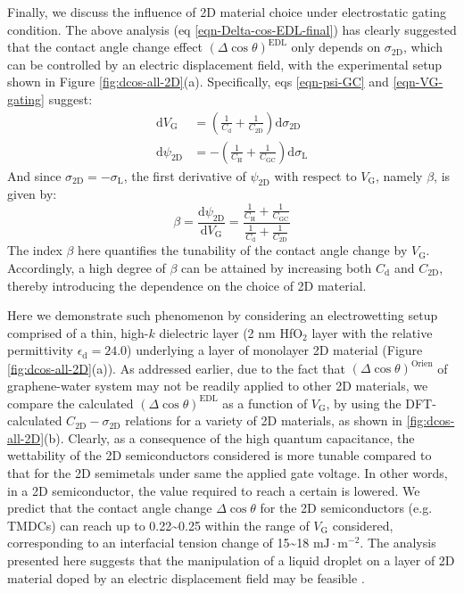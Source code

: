 \documentclass[journal=langd5,manuscript=article,email=true,hyperref=true,keywords=true]{achemso}
\begin{document}
Finally, we discuss the influence of 2D material choice under
electrostatic gating condition. The above analysis (eq
\ref{eqn-Delta-cos-EDL-final}) has clearly suggested that the contact
angle change effect \((\Delta \cos \theta)^{\mathrm{EDL}}\) only depends
on \(\sigma_{\mathrm{2D}}\), which can be controlled by an electric
displacement field, with the experimental setup shown in Figure
\ref{fig:dcos-all-2D}(a). Specifically,  eqs \ref{eqn-psi-GC} and
\ref{eqn-VG-gating} suggest:
\begin{equation}
\label{eqn-dVG-choice-2D}
\begin{aligned}
\mathrm{d} V_{\mathrm{G}} &= (\frac{1}{C_{\mathrm{d}}} + \frac{1}{C_{\mathrm{2D}}}) \mathrm{d} \sigma_{\mathrm{2D}} \\
\mathrm{d} \psi_{\mathrm{2D}} &= -(\frac{1}{C_{\mathrm{H}}} + \frac{1}{C_{\mathrm{GC}}}) \mathrm{d} \sigma_{\mathrm{L}}
\end{aligned}
\end{equation}
And since \(\sigma_{\mathrm{2D}} = -\sigma_{\mathrm{L}}\), the first
derivative of \(\psi_{\mathrm{2D}}\) with respect to \(V_{\mathrm{G}}\), namely \(\beta\), is given by:
\begin{equation}
\label{eqn-def-beta}
\beta = \frac{\mathrm{d} \psi_{\mathrm{2D}}}{\mathrm{d} V_{\mathrm{G}}} 
      = \frac{\frac{1}{C_{\mathrm{H}}} + \frac{1}{C_{\mathrm{GC}}}}{\frac{1}{C_{\mathrm{d}}} + \frac{1}{C_{\mathrm{2D}}}}
\end{equation}
The index \(\beta\) here quantifies the tunability of the contact angle change
by \(V_{\mathrm{G}}\). Accordingly, a high degree of \(\beta\) can be attained by increasing both \(C_{\mathrm{d}}\) and
\(C_{\mathrm{2D}}\), thereby introducing the dependence on the choice of 2D material.

Here we demonstrate such phenomenon by considering an electrowetting
setup comprised of a thin, high-\(k\) dielectric layer (2 nm
HfO\(_{\text{2}}\) layer with the relative permittivity
\(\epsilon_{\mathrm{d}}=24.0\)) underlying a layer of monolayer 2D
material (Figure \ref{fig:dcos-all-2D}(a)).  As addressed earlier, due
to the fact that \((\Delta \cos \theta)^{\mathrm{Orien}}\) of
graphene-water system may not be readily applied to other 2D
materials, we compare the calculated
\((\Delta \cos \theta)^{\mathrm{EDL}}\) as a function of
\(V_{\mathrm{G}}\), by using the DFT-calculated
\(C_{\mathrm{2D}} - \sigma_{\mathrm{2D}}\) relations for a variety of
2D materials, as shown in \ref{fig:dcos-all-2D}(b). Clearly, as a
consequence of the high quantum capacitance, the wettability of the 2D
semiconductors considered is more tunable compared to that for the 2D
semimetals under same the applied gate voltage. In other words, in a 2D
semiconductor, the value required to reach a certain is lowered. We
predict that the contact angle change \(\Delta \cos \theta\) for the
2D semiconductors (e.g. TMDCs) can reach up to
0.22\textasciitilde{}0.25 within the range of \(V_{\mathrm{G}}\)
considered, corresponding to an interfacial tension change of
15\textasciitilde{}18 \(\mathrm{mJ} \cdot \mathrm{m}^{-2}\). The
analysis presented here suggests that the manipulation of a liquid
droplet on a layer of 2D material doped by an electric displacement
field may be feasible \cite{Mugele_2005,Hayes_2003_nature_EWOD}.
\end{document}
